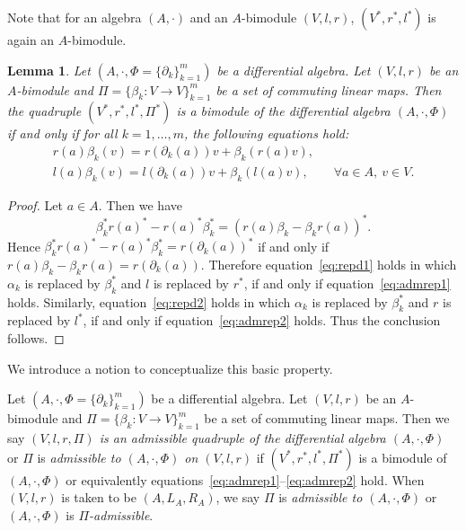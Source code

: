 \documentclass[10pt,a4paper]{amsart}
\numberwithin{equation}{section}
\newtheorem{Lemma}[Theorem]{Lemma}
\begin{document}
Note that for an algebra $(A,\cdot)$ and an $A$-bimodule $(V, l, r)$, $(V^*, r^*, l^*)$ is again an $A$-bimodule.

\begin{Lemma}\label{lem:dualrep}
 Let $(A, \cdot, \Phi = \{\partial_k\}_{k=1}^m)$ be a differential algebra.
 Let $(V, l, r)$ be an $A$-bimodule
 and $\Pi = \{\beta_k\colon V \to V\}_{k=1}^m$ be a set of commuting linear maps.
 Then the quadruple $(V^*, r^*, l^*, \Pi^*)$ is a bimodule of the differential algebra $(A, \cdot, \Phi)$ if and only if for all $k=1, \dots,
 m$, the following equations hold:
 \begin{gather}
 r(a) \beta_k(v) = r(\partial_k(a)) v + \beta_k(r(a)v), \label{eq:admrep1} \\
 l(a) \beta_k(v) = l(\partial_k(a)) v + \beta_k(l(a)v), \qquad
 \forall a \in A, \ v \in V. \label{eq:admrep2}
 \end{gather}
\end{Lemma}
\begin{proof}
	Let $a \in A$. Then we have
	\begin{equation*}
		\beta_k^* r(a)^* - r(a)^* \beta_k^* = (r(a) \beta_k - \beta_k r(a))^*.
	\end{equation*}
	Hence $\beta_k^* r(a)^* - r(a)^* \beta_k^* = r(\partial_k(a))^*$ if and only if $r(a) \beta_k - \beta_k r(a) = r(\partial_k(a))$.
	Therefore equation~\eqref{eq:repd1} holds in which $\alpha_k$ is replaced by $\beta_k^*$ and $l$ is replaced by $r^*$, if and only if equation~\eqref{eq:admrep1} holds.
	Similarly, equation~\eqref{eq:repd2} holds in which $\alpha_k$ is replaced by $\beta_k^*$ and $r$ is replaced by $l^*$, if and only if equation~\eqref{eq:admrep2} holds.
	Thus the conclusion follows.
\end{proof}


We introduce a notion to conceptualize this basic property.
\begin{Definition}\label{def:admissible}
 Let $(A, \cdot, \Phi = \{\partial_k\}_{k=1}^m)$ be a differential algebra.
 Let $(V, l, r)$ be an $A$-bimodule
 and $\Pi = \{\beta_k\colon V \to V\}_{k=1}^m$ be a set of commuting linear maps.
 Then we say \textit{$(V,l,r,\Pi)$ is an admissible quadruple of the differential algebra $(A, \cdot, \Phi)$} or
$\Pi$ is \textit{admissible to $(A, \cdot, \Phi)$ on $(V, l, r)$}
 if $(V^*, r^*, l^*, \Pi^*)$ is a bimodule of $(A, \cdot, \Phi)$ or equivalently equations~\eqref{eq:admrep1}--\eqref{eq:admrep2} hold.
 When $(V, l, r)$ is taken to be $(A, L_A, R_A)$, we say $\Pi$ is \textit{admissible to $(A, \cdot, \Phi)$} or $(A, \cdot, \Phi)$ is \textit{$\Pi$-admissible}.
\end{Definition}
\end{document}
